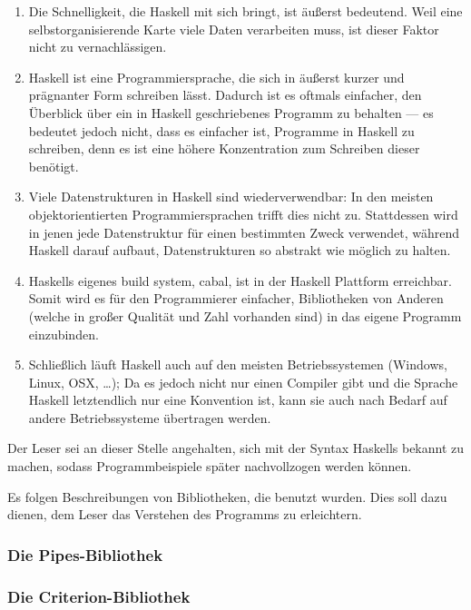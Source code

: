 \documentclass[twoside,a4paper,draft]{article}
\begin{document}
\begin{multicols}{2}
\begin{enumerate}
\item Die Schnelligkeit, die Haskell mit sich bringt, ist äußerst bedeutend. Weil eine selbstorganisierende Karte viele Daten verarbeiten muss, ist dieser Faktor nicht zu vernachlässigen.
\item Haskell ist eine Programmiersprache, die sich in äußerst kurzer und prägnanter Form schreiben lässt. Dadurch ist es oftmals einfacher, den Überblick über ein in Haskell geschriebenes Programm zu behalten --- es bedeutet jedoch nicht, dass es einfacher ist, Programme in Haskell zu schreiben, denn es ist eine höhere Konzentration zum Schreiben dieser benötigt.
\item Viele Datenstrukturen in Haskell sind wiederverwendbar: In den meisten objektorientierten Programmiersprachen trifft dies nicht zu. Stattdessen wird in jenen jede Datenstruktur für einen bestimmten Zweck verwendet, während Haskell darauf aufbaut, Datenstrukturen so abstrakt wie möglich zu halten.
\item Haskells eigenes \glqq{}build system\grqq{}, cabal, ist in der Haskell Plattform erreichbar. Somit wird es für den Programmierer einfacher, Bibliotheken von Anderen (welche in großer Qualität und Zahl vorhanden sind) in das eigene Programm einzubinden.
\item Schließlich läuft Haskell auch auf den meisten Betriebssystemen (Windows, Linux, OSX, \dots{}); Da es jedoch nicht nur einen Compiler gibt und die Sprache Haskell letztendlich nur eine Konvention ist, kann sie auch nach Bedarf auf andere Betriebssysteme übertragen werden.
\end{enumerate}

Der Leser sei an dieser Stelle angehalten, sich mit der Syntax Haskells bekannt zu machen, sodass Programmbeispiele später nachvollzogen werden können.

Es folgen Beschreibungen von Bibliotheken, die benutzt wurden. Dies soll dazu dienen, dem Leser das Verstehen des Programms zu erleichtern.

\subsubsection{Die Pipes-Bibliothek}

\subsubsection{Die Criterion-Bibliothek}


\end{multicols}
\end{document}
